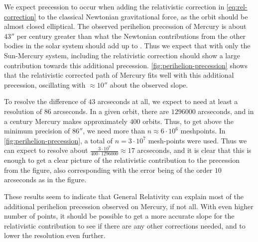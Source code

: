 \documentclass[../main.tex]{subfiles}
\begin{document}
We expect precession to occur when adding the relativistic correction in \cref{eq:rel-correction} to the classical Newtonian gravitational force, as the orbit should be almost closed elliptical. The observed perihelion precession of Mercury is about $43''$ per century greater than what the Newtonian contributions from the other bodies in the solar system should add up to \cite{Pollock2003}. Thus we expect that with only the Sun-Mercury system, including the relativistic correction should show a large contribution towards this additional precession. \cref{fig:perihelion-precession} shows that the relativistic corrected path of Mercury fits well with this additional precession, oscillating with $\approx 10''$ about the observed slope.

To resolve the difference of $43$ arcseconds at all, we expect to need at least a resolution of $86$ arcseconds. In a given orbit, there are $1296000$ arcseconds, and in a century Mercury makes approximately $400$ orbits. Thus, to get above the minimum precision of $86''$, we need more than $n \approx 6 \cdot 10^6$ meshpoints. In \cref{fig:perihelion-precession}, a total of $n = 3 \cdot 10^7$ mesh-points were used. Thus we can expect to resolve about $\frac{3 \cdot 10^7}{400 \cdot 1296000} \approx 17$ arcseconds, and it is clear that this is enough to get a clear picture of the relativistic contribution to the precession from the figure, also corresponding with the error being of the order $10$ arcseconds as in the figure.

These results seem to indicate that General Relativity can explain most of the additional perihelion precession observed on Mercury, if not all. With even higher number of points, it should be possible to get a more accurate slope for the relativistic contribution to see if there are any other corrections needed, and to lower the resolution even further.
\end{document}
